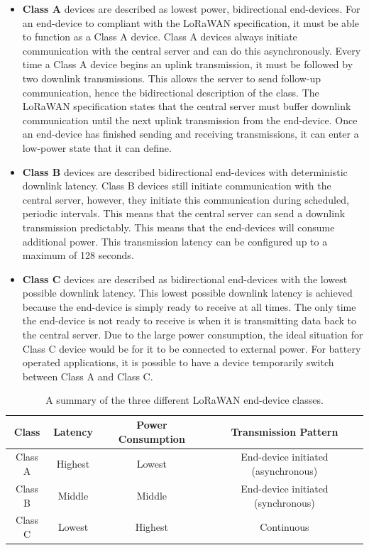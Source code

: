 \begin{itemize}
    \item \textbf{Class A} devices are described as lowest power, bidirectional end-devices. For an end-device to compliant with the LoRaWAN specification, it must be able to function as a Class A device. Class A devices always initiate communication with the central server and can do this asynchronously. Every time a Class A device begins an uplink transmission, it must be followed by two downlink transmissions. This allows the server to send follow-up communication, hence the bidirectional description of the class. The LoRaWAN specification states that the central server must buffer downlink communication until the next uplink transmission from the end-device. Once an end-device has finished sending and receiving transmissions, it can enter a low-power state that it can define.
    
    
    \item \textbf{Class B} devices are described bidirectional end-devices with deterministic downlink latency. Class B devices still initiate communication with the central server, however, they initiate this communication during scheduled, periodic intervals. This means that the central server can send a downlink transmission predictably. This means that the end-devices will consume additional power. This transmission latency can be configured up to a maximum of 128 seconds.
    
    
    \item \textbf{Class C} devices are described as bidirectional end-devices with the lowest possible downlink latency. This lowest possible downlink latency is achieved because the end-device is simply ready to receive at all times. The only time the end-device is not ready to receive is when it is transmitting data back to the central server. Due to the large power consumption, the ideal situation for Class C device would be for it to be connected to external power. For battery operated applications, it is possible to have a device temporarily switch between Class A and Class C.
\end{itemize}


\begin{table}[]
\centering
\begin{tabular}{|c|c|c|c|}
\hline
Class & Latency & Power Consumption & Transmission Pattern \\\hline
\hline
Class A & Highest & Lowest & End-device initiated (asynchronous) \\\hline
Class B & Middle & Middle & End-device initiated (synchronous) \\\hline
Class C & Lowest & Highest & Continuous \\\hline
\end{tabular}
\caption{A summary of the three different LoRaWAN end-device classes.}
\label{tab:lorawan-classes}
\end{table}


